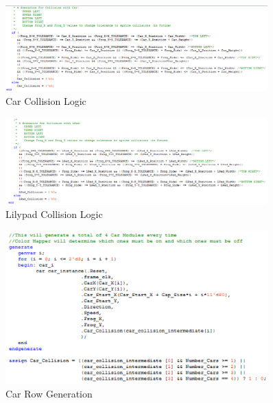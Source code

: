 \documentclass[journal, twocolumn, final,11pt,letterpaper]{IEEEtran}
\begin{document}
\begin{figure}[H]
	\centering
	\includegraphics[width=0.9\textwidth]{car_collision.png}
	\caption{Car Collision Logic}
	\label{fig:car-collision}
\end{figure}

\begin{figure}[H]
	\centering
	\includegraphics[width=0.9\textwidth]{lilypad_collision.png}
	\caption{Lilypad Collision Logic}
	\label{fig:lilypad-collision}
\end{figure}

\begin{figure}[H]
	\centering
	\includegraphics[width=0.9\textwidth]{car_row_generation.png}
	\caption{Car Row Generation}
	\label{fig:car-row-generation}
\end{figure}
\end{document}
